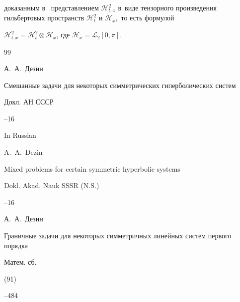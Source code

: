 доказанным в~\cite{alex:bib9} представлением $\mathcal{H}^2_{t,x}$ в~виде тензорного произведения гильбертовых пространств $\mathcal{H}^2_{t}$ и $\mathcal{H}_{x},$ то есть формулой

$\mathcal{H}^2_{t,x}=\mathcal{H}^2_{t}\otimes\mathcal{H}_{x}$, где $\mathcal{H}_{x}=\mathcal{L}_2[0,\pi]$.



\pagebreak



\begin{thebibliography}{99}




\by А.~А.~Дезин

\paper Смешанные задачи для некоторых симметрических гиперболических систем

\jour Докл. АН СССР




--16



\misctransl

\lang In Russian

\by A.~A.~Dezin

\paper Mixed problems for certain symmetric hyperbolic systems

\jour Dokl. Akad. Nauk SSSR (N.S.)




--16




\by А.~А.~Дезин

\paper Граничные задачи для некоторых симметричных линейных систем первого порядка

\jour Матем. сб.


(91)


--484




\end{thebibliography}
